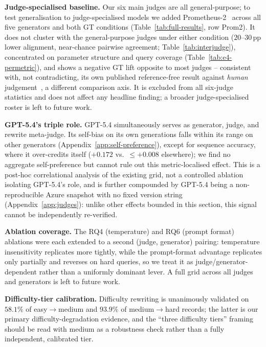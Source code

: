 \textbf{Judge-specialised baseline.} Our six main judges are all general-purpose; to test generalisation to judge-specialised models we added Prometheus-2~\citep{kim2024prometheus2} across all five generators and both GT conditions (Table~\ref{tab:full-results}, row Prom2). It does not cluster with the general-purpose judges under either condition ($20$--$30$\,pp lower alignment, near-chance pairwise agreement; Table~\ref{tab:interjudge}), concentrated on parameter structure and query coverage (Table~\ref{tab:e4-permetric}), and shows a negative GT lift opposite to most judges -- consistent with, not contradicting, its own published reference-free result against \emph{human} judgement~\citep[Appendix F]{kim2024prometheus2}, a different comparison axis. It is excluded from all six-judge statistics and does not affect any headline finding; a broader judge-specialised roster is left to future work.

\textbf{GPT-5.4's triple role.} GPT-5.4 simultaneously serves as generator, judge, and rewrite meta-judge. Its self-bias on its own generations falls within its range on other generators (Appendix~\ref{app:self-preference}), except for sequence accuracy, where it over-credits itself ($+0.172$ vs.\ $\leq+0.008$ elsewhere); we find no aggregate self-preference but cannot rule out this metric-localised effect. This is a post-hoc correlational analysis of the existing grid, not a controlled ablation isolating GPT-5.4's role, and is further compounded by GPT-5.4 being a non-reproducible Azure snapshot with no fixed version string (Appendix~\ref{app:judges}): unlike other effects bounded in this section, this signal cannot be independently re-verified.

\textbf{Ablation coverage.} The RQ4 (temperature) and RQ6 (prompt format) ablations were each extended to a second (judge, generator) pairing: temperature insensitivity replicates more tightly, while the prompt-format advantage replicates only partially and reverses on hard queries, so we treat it as judge/generator-dependent rather than a uniformly dominant lever. A full grid across all judges and generators is left to future work.

\textbf{Difficulty-tier calibration.} Difficulty rewriting is unanimously validated on $58.1\%$ of easy$\to$medium and $93.9\%$ of medium$\to$hard records; the latter is our primary difficulty-degradation evidence, and the ``three difficulty tiers'' framing should be read with medium as a robustness check rather than a fully independent, calibrated tier.

